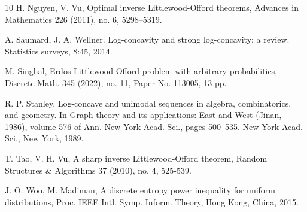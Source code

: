 \documentclass[11pt]{article}
\newcommand{\1}{[1]}
\begin{document}
\begin{thebibliography}{10}
 H. Nguyen, V. Vu, Optimal inverse Littlewood-Offord theorems, Advances in Mathematics 226 (2011), no. 6, 5298--5319.

 A. Saumard, J. A. Wellner. Log-concavity and strong log-concavity: a review. Statistics surveys, 8:45, 2014.

 M. Singhal, Erd\"os-Littlewood-Offord problem with arbitrary probabilities, Discrete Math. 345 (2022), no. 11, Paper No. 113005, 13 pp.

 R. P. Stanley, Log-concave and unimodal sequences in algebra, combinatorics, and geometry. In Graph theory and its applications: East and West (Jinan, 1986), volume 576 of Ann. New York Acad. Sci., pages 500--535. New York Acad. Sci., New York, 1989.

 T. Tao, V. H. Vu, A sharp inverse Littlewood-Offord theorem, Random Structures \& Algorithms 37 (2010), no. 4, 525-539.

 J. O. Woo, M. Madiman, A discrete entropy power inequality for uniform distributions, Proc. IEEE Intl. Symp. Inform. Theory, Hong Kong, China, 2015.

\end{thebibliography}

\end{document}
